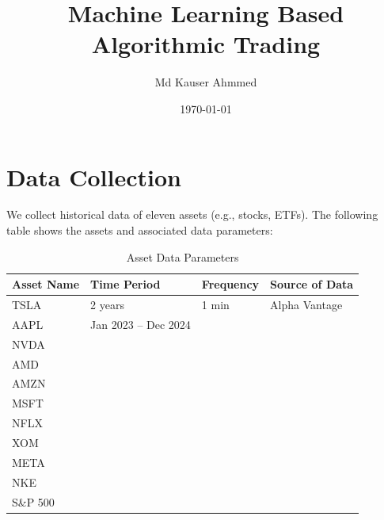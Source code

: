 \documentclass[11pt]{article}
\title{Machine Learning Based Algorithmic Trading}
\author{Md Kauser Ahmmed}
\date{\today}
\begin{document}
\maketitle


\section{Data Collection}
We collect historical data of eleven assets (e.g., stocks, ETFs). The following table shows the assets and associated data parameters:

\begin{table}[ht]
    \centering
    \begin{tabular}{|l|l|l|l|}
        \hline
        \textbf{Asset Name} & \textbf{Time Period} & \textbf{Frequency} & \textbf{Source of Data} \\ \hline
        TSLA                & 2 years              & 1 min              & Alpha Vantage           \\ \hline
        AAPL                & Jan 2023 -- Dec 2024 &                   &                         \\ \hline
        NVDA                &                      &                   &                         \\ \hline
        AMD                 &                      &                   &                         \\ \hline
        AMZN                &                      &                   &                         \\ \hline
        MSFT                &                      &                   &                         \\ \hline
        NFLX                &                      &                   &                         \\ \hline
        XOM                 &                      &                   &                         \\ \hline
        META                &                      &                   &                         \\ \hline
        NKE                 &                      &                   &                         \\ \hline
        S\&P 500            &                      &                   &                         \\ \hline
    \end{tabular}
    \caption{Asset Data Parameters}
    \label{tab:asset_data}
\end{table}
\end{document}
